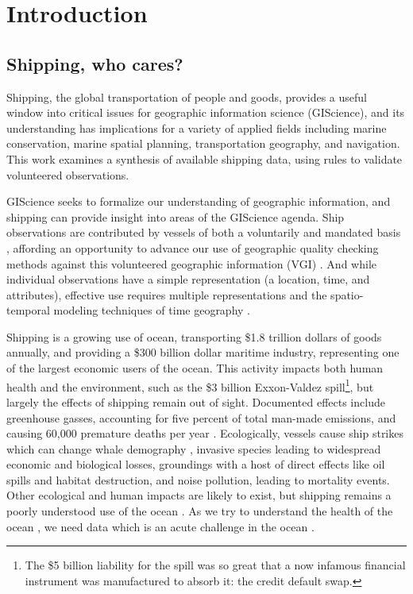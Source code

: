 \section{Introduction}


\subsection{Shipping, who cares?}

Shipping, the global transportation of people and goods, provides a useful window into critical issues for geographic information science (GIScience), and its understanding has implications for a variety of applied fields including marine conservation, marine spatial planning, transportation geography, and navigation.  This work examines a synthesis of available shipping data, using rules to validate volunteered observations.

GIScience seeks to formalize our understanding of geographic information, and shipping can provide insight into areas of the GIScience agenda. Ship observations are contributed by vessels of both a voluntarily and mandated basis \citep{VOSClim,Tetreault2002}, affording an opportunity to advance our use of geographic quality checking methods \citep{goodchildli2012} against this volunteered geographic information (VGI) \citep{goodchild2007citizens}. And while individual observations have a simple representation (a location, time, and attributes), effective use requires multiple representations \citep{Goodchild1992} and the spatio-temporal modeling techniques of time geography \citep{miller2008field}.

Shipping is a growing use of ocean, transporting \$1.8 trillion dollars of goods annually, %
and providing a \$300 billion dollar maritime industry, representing one of the largest economic users of the ocean. This activity impacts both human health and the environment, such as the \$3 billion Exxon-Valdez spill\footnote{The \$5 billion liability for the spill was so great that a now infamous financial instrument was manufactured to absorb it: the credit default swap.}, but largely the effects of shipping remain out of sight. Documented effects include greenhouse gasses, accounting for five percent of total man-made emissions, and causing 60,000 premature deaths per year \cite{Corbett2007}. Ecologically, vessels cause ship strikes which can change whale demography \citep{Fujiwara2001}, %
 invasive species leading to widespread economic and biological losses, groundings with a host of direct effects like oil spills and habitat destruction, and noise pollution, leading to mortality events. Other ecological and human impacts are likely to exist, but shipping remains a poorly understood use of the ocean \citep{Davenport2006}. As we try to understand the health of the ocean \citep{Halpern2012}, we need data %
 which is an acute challenge in the ocean \cite{Wright1997}.

